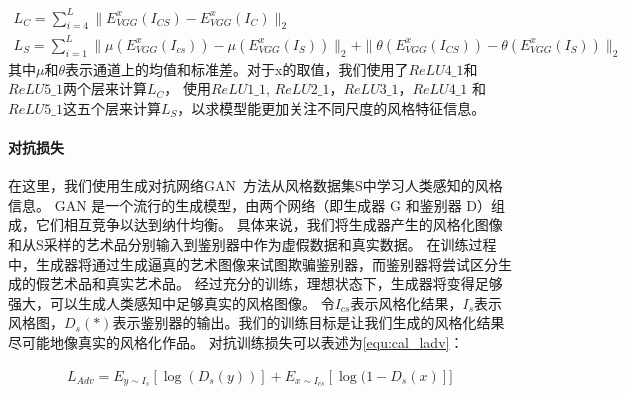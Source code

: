 \begin{equation}
    \label{equ:cal_perceptual_loss_cs}
    \begin{gathered}
        L_{C} = \sum_{i=4}^{L} \parallel E_{VGG}^{x}(I_{CS}) - E_{VGG}^{x}(I_{C}) \parallel_{2} \\
        L_{S} = \sum_{i=1}^{L} \parallel \mu(E_{VGG}^{x}(I_{cs})) - \mu(E_{VGG}^{x}(I_{S})) \parallel_{2} + \parallel \theta(E_{VGG}^{x}(I_{CS})) - \theta(E_{VGG}^{x}(I_{S})) \parallel_{2}
    \end{gathered}
\end{equation}
其中$\mu$和$\theta$表示通道上的均值和标准差。对于x的取值，我们使用了$ReLU4\_1$和$ReLU5\_1$两个层来计算$L_C$，
使用$ReLU1\_1$, $ReLU2\_1$，$ReLU3\_1$，$ReLU4\_1$
和$ReLU5\_1$这五个层来计算$L_S$，以求模型能更加关注不同尺度的风格特征信息。

\paragraph{对抗损失}
\par 在这里，我们使用生成对抗网络GAN~\cite{goodfellow2020generative}方法从风格数据集S中学习人类感知的风格信息。
GAN 是一个流行的生成模型，由两个网络（即生成器 G 和鉴别器 D）组成，它们相互竞争以达到纳什均衡。
具体来说，我们将生成器产生的风格化图像和从S采样的艺术品分别输入到鉴别器中作为虚假数据和真实数据。
在训练过程中，生成器将通过生成逼真的艺术图像来试图欺骗鉴别器，而鉴别器将尝试区分生成的假艺术品和真实艺术品。
经过充分的训练，理想状态下，生成器将变得足够强大，可以生成人类感知中足够真实的风格图像。
令$I_{cs}$表示风格化结果，$I_s$表示风格图，$D_s (*)$表示鉴别器的输出。我们的训练目标是让我们生成的风格化结果尽可能地像真实的风格化作品。
对抗训练损失可以表述为\autoref{equ:cal_ladv}：

\begin{equation}
    \label{equ:cal_ladv}
    \begin{aligned}
    L_{Adv}=E_{y\sim I_s}[\log(D_s(y))]+E_{x\sim I_{cs}}[\log(1-D_s(x)]]
    \end{aligned}
\end{equation}
